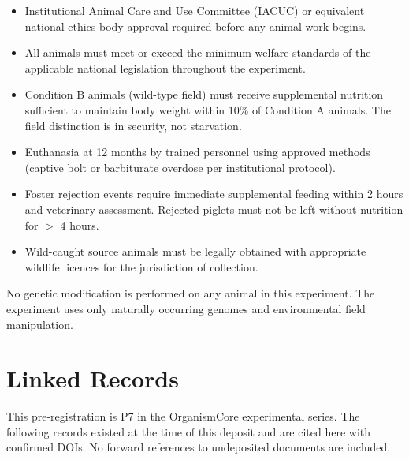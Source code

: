 \documentclass[10pt, a4paper]{article}
\begin{document}
\begin{itemize}[itemsep=0.15em]
  \item Institutional Animal Care and Use
    Committee (IACUC) or equivalent national
    ethics body approval required before
    any animal work begins.
  \item All animals must meet or exceed the
    minimum welfare standards of the applicable
    national legislation throughout the experiment.
  \item Condition B animals (wild-type field)
    must receive supplemental nutrition sufficient
    to maintain body weight within 10\% of
    Condition A animals. The field distinction
    is in security, not starvation.
  \item Euthanasia at 12 months by trained
    personnel using approved methods (captive
    bolt or barbiturate overdose per institutional
    protocol).
  \item Foster rejection events require immediate
    supplemental feeding within 2 hours and
    veterinary assessment. Rejected piglets must
    not be left without nutrition for $>$ 4 hours.
  \item Wild-caught source animals must be legally
    obtained with appropriate wildlife licences
    for the jurisdiction of collection.
\end{itemize}

No genetic modification is performed on any
animal in this experiment. The experiment
uses only naturally occurring genomes and
environmental field manipulation.

\section{Linked Records}
\label{sec:linked}

This pre-registration is P7 in the OrganismCore
experimental series. The following records
existed at the time of this deposit and are
cited here with confirmed DOIs.
No forward references to undeposited documents
are included.
\end{document}
